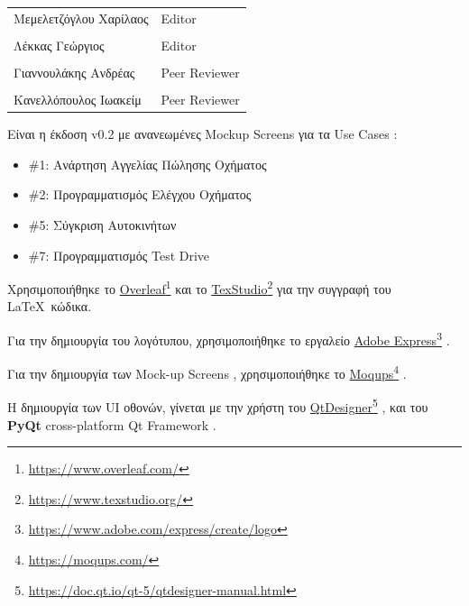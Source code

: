 \documentclass{../ol-softwaremanual}
\newcommand{\doclink}[2]{\href{#1}{#2}\footnote{\url{#1}}}
\begin{document}
	
	\vspace{20pt}
	
	\begin{table}[htbp!]
		\begin{tabular}{ll}
			Μεμελετζόγλου Χαρίλαος & \en Editor \\
			\\ Λέκκας Γεώργιος      &   \en  Editor \\
			\\ Γιαννουλάκης Ανδρέας & \en Peer Reviewer \\
			\\ Κανελλόπουλος Ιωακείμ & \en Peer Reviewer
		\end{tabular}
	\end{table}
	
	\vspace{10pt}
	
	Είναι η έκδοση \en v0.2 \gr με ανανεωμένες \en Mockup Screens \gr για τα \en Use Cases \gr :
	
	\begin{itemize}
		\item \en \#1: \gr  Ανάρτηση Αγγελίας Πώλησης Οχήματος
		\item  \en \#2: \gr Προγραμματισμός Ελέγχου Οχήματος
		\item \en \#5: \gr Σύγκριση Αυτοκινήτων
		\item \en \#7: \gr Προγραμματισμός \en Test Drive \gr
	\end{itemize}
	
	\newpage
	
	
	
	
	\vspace{20pt}
	\flushleft
	
	Χρησιμοποιήθηκε το \en \doclink{https://www.overleaf.com/}{Overleaf} \gr και το \en \doclink{https://www.texstudio.org/}{TexStudio} \gr για την συγγραφή του \LaTeX\ κώδικα. \break
	
	Για την δημιουργία του λογότυπου, χρησιμοποιήθηκε το εργαλείο \en \doclink{https://www.adobe.com/express/create/logo}{Adobe Express} . \gr \break
	
	Για την δημιουργία των \en Mock-up Screens \gr, χρησιμοποιήθηκε το \en \doclink{https://moqups.com/}{Moqups} \gr . \break
	
	Η δημιουργία των \en UI \gr οθονών, γίνεται με την χρήστη του \en \doclink{https://doc.qt.io/qt-5/qtdesigner-manual.html}{QtDesigner} \gr, και του  \en \textbf{PyQt} cross-platform Qt Framework \gr. \break
	
\end{document}
